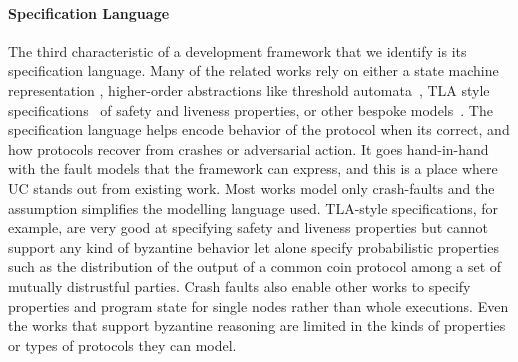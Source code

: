 \paragraph{Specification Language}
The third characteristic of a development framework that we identify is its specification language.
Many of the related works rely on either a state machine representation \cite{killian2007mace}, higher-order abstractions like threshold automata~\cite{tholoniat2022formal}, TLA style specifications~\cite{hawblitze2015ironfleet, bolosky2007farsite} of safety and liveness properties, or other bespoke models~\cite{wilcox2015verdi}.
The specification language helps encode behavior of the protocol when its correct, and how protocols recover from crashes or adversarial action.
It goes hand-in-hand with the fault models that the framework can express, and this is a place where UC stands out from existing work.
Most works model only crash-faults and the assumption simplifies the modelling language used.
TLA-style specifications, for example, are very good at specifying safety and liveness properties but cannot support any kind of byzantine behavior let alone specify probabilistic properties such as the distribution of the output of a common coin protocol among a set of mutually distrustful parties.
Crash faults also enable other works to specify properties and program state for single nodes rather than whole executions. 
Even the works that support byzantine reasoning are limited in the kinds of properties or types of protocols they can model.

